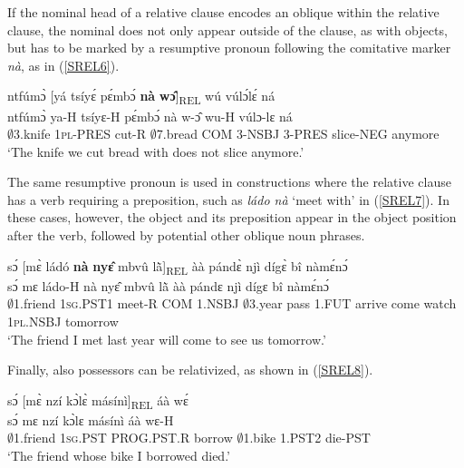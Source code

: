 If the nominal head of a relative clause encodes an oblique within the relative clause, the nominal does not only appear outside of the clause, as with objects, but has to be marked by a resumptive pronoun following the comitative marker {\itshape nà}, as in (\ref{SREL6}).

\begin{exe}
\ex \label{SREL6} 
  \glll ntfúmɔ̀ [yá tsíyɛ́ pɛ́mbɔ́ {\bfseries nà} {\bfseries wɔ̂}]\textsubscript{REL} wú vúlɔ́lɛ́ ná \\
         ntfúmɔ̀ ya-H tsíyɛ-H pɛ́mbɔ́ nà w-ɔ̂ wu-H vúlɔ-lɛ ná \\
         $\emptyset$3.knife 1\textsc{pl}-PRES cut-R $\emptyset$7.bread COM 3-NSBJ 3-PRES slice-NEG anymore\\ 
    \trans `The knife we cut bread with does not slice anymore.'
\end{exe}

\noindent The same resumptive pronoun is used in constructions where the relative clause has a verb requiring a preposition, such as {\itshape ládo nà} `meet with' in (\ref{SREL7}). In these cases, however, the object and its preposition appear in the object position after the verb, followed by potential other oblique noun phrases.

\begin{exe}
\ex \label{SREL7} 
  \glll sɔ́ [mɛ̀ ládó {\bfseries nà} {\bfseries nyɛ̂} mbvû lã̀]\textsubscript{REL} àà pándɛ̀ njì dígɛ̀ bî nàmɛ́nɔ́ \\
         sɔ́ mɛ ládo-H nà nyɛ̂ mbvû lã̀ àà pándɛ njì dígɛ bî nàmɛ́nɔ́ \\
         $\emptyset$1.friend 1\textsc{sg}.PST1 meet-R COM 1.NSBJ $\emptyset$3.year pass 1.FUT arrive come watch 1\textsc{pl}.NSBJ tomorrow \\ 
    \trans `The friend I met last year will come to see us tomorrow.'
\end{exe}

Finally, also possessors can be relativized, as shown in (\ref{SREL8}).

\begin{exe}
\ex \label{SREL8} 
  \glll sɔ́ [mɛ̀ nzí kɔ̀lɛ̀ másínì]\textsubscript{REL} áà wɛ́\\
         sɔ́ mɛ nzí kɔ̀lɛ másínì áà wɛ-H \\
         $\emptyset$1.friend 1\textsc{sg}.PST PROG.PST.R borrow $\emptyset$1.bike 1.PST2 die-PST \\ 
    \trans `The friend whose bike I borrowed died.'
\end{exe}




